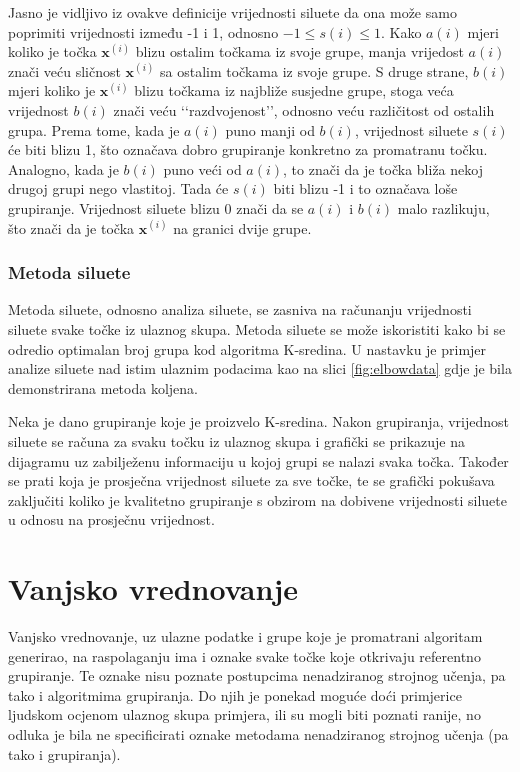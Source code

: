 \documentclass[times, utf8, zavrsni]{fer}
\begin{document}
Jasno je vidljivo iz ovakve definicije vrijednosti siluete da ona može samo poprimiti vrijednosti između -1 i 1, odnosno $-1 \leq s (i) \leq 1$. Kako $a (i)$ mjeri koliko je točka $\mathbf{x}^{(i)}$ blizu ostalim točkama iz svoje grupe, manja vrijedost $a(i)$ znači veću sličnost $\mathbf{x}^{(i)}$ sa ostalim točkama iz svoje grupe. S druge strane, $b(i)$ mjeri koliko je $\mathbf{x}^{(i)}$ blizu točkama iz najbliže susjedne grupe, stoga veća vrijednost $b (i)$ znači veću ‘‘razdvojenost’’, odnosno veću različitost od ostalih grupa. Prema tome, kada je $a(i)$ puno manji od $b(i)$, vrijednost siluete $s (i)$ će biti blizu 1, što označava dobro grupiranje konkretno za promatranu točku. Analogno, kada je $b (i)$ puno veći od $a (i)$, to znači da je točka bliža nekoj drugoj grupi nego vlastitoj. Tada će $s(i)$ biti blizu -1 i to označava loše grupiranje. Vrijednost siluete blizu 0 znači da se $a(i)$ i $b(i)$ malo razlikuju, što znači da je točka $\mathbf{x}^{(i)}$ na granici dvije grupe.

\subsubsection{Metoda siluete}
Metoda siluete, odnosno analiza siluete, se zasniva na računanju vrijednosti siluete svake točke iz ulaznog skupa. Metoda siluete se može iskoristiti kako bi se odredio optimalan broj grupa kod algoritma K-sredina. U nastavku je primjer analize siluete nad istim ulaznim podacima kao na slici \ref{fig:elbowdata} gdje je bila demonstrirana metoda koljena.

Neka je dano grupiranje koje je proizvelo K-sredina. Nakon grupiranja, vrijednost siluete se računa za svaku točku iz ulaznog skupa i grafički se prikazuje na dijagramu uz zabilježenu informaciju u kojoj grupi se nalazi svaka točka. Također se prati koja je prosječna vrijednost siluete za sve točke, te se grafički pokušava zaključiti koliko je kvalitetno grupiranje s obzirom na dobivene vrijednosti siluete u odnosu na prosječnu vrijednost.

\section{Vanjsko vrednovanje}
Vanjsko vrednovanje, uz ulazne podatke i grupe koje je promatrani algoritam generirao, na raspolaganju ima i oznake svake točke koje otkrivaju referentno grupiranje. Te oznake nisu poznate postupcima nenadziranog strojnog učenja, pa tako i algoritmima grupiranja. Do njih je ponekad moguće doći primjerice ljudskom ocjenom ulaznog skupa primjera, ili su mogli biti poznati ranije, no odluka je bila ne specificirati oznake metodama nenadziranog strojnog učenja (pa tako i grupiranja).
\end{document}
